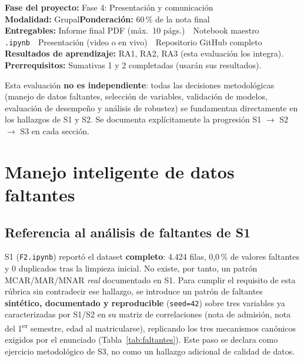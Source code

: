 \documentclass[11pt,a4paper]{article}
\begin{document}
\clearpage
{}
\begin{infobox}
\textbf{Fase del proyecto:} Fase 4: Presentación y comunicación\\
\textbf{Modalidad:} Grupal\qquad\textbf{Ponderación:} 60\,\% de la nota final\\
\textbf{Entregables:} Informe final PDF (máx.\ 10 págs.)\ \textperiodcentered\ Notebook maestro \texttt{.ipynb}\ \textperiodcentered\ Presentación (video o en vivo)\ \textperiodcentered\ Repositorio GitHub completo\\
\textbf{Resultados de aprendizaje:} RA1, RA2, RA3 (esta evaluación los integra).\\
\textbf{Prerrequisitos:} Sumativas 1 y 2 completadas (usarán sus resultados).
\end{infobox}
\begin{conexionbox}
Esta evaluación \textbf{no es independiente}: todas las decisiones metodológicas (manejo de datos faltantes, selección de variables, validación de modelos, evaluación de desempeño y análisis de robustez) se fundamentan directamente en los hallazgos de S1 y S2. Se documenta explícitamente la progresión S1 $\to$ S2 $\to$ S3 en cada sección.
\end{conexionbox}

\vspace{0.3em}
\tableofcontents
\newpage

\section{Manejo inteligente de datos faltantes}

\subsection{Referencia al análisis de faltantes de S1}

S1 (\texttt{F2.ipynb}) reportó el dataset \textbf{completo}: 4.424 filas, 0{,}0\,\% de valores
faltantes y 0 duplicados tras la limpieza inicial. No existe, por tanto, un patrón MCAR/MAR/MNAR
\emph{real} documentado en S1. Para cumplir el requisito de esta rúbrica sin contradecir ese
hallazgo, se introduce un patrón de faltantes \textbf{sintético, documentado y reproducible}
(\texttt{seed=42}) sobre tres variables ya caracterizadas por S1/S2 en su matriz de correlaciones
(nota de admisión, nota del 1\textsuperscript{er} semestre, edad al matricularse), replicando los
tres mecanismos canónicos exigidos por el enunciado (Tabla~\ref{tab:faltantes}). Este paso se
declara como ejercicio metodológico de S3, no como un hallazgo adicional de calidad de datos.
\end{document}
